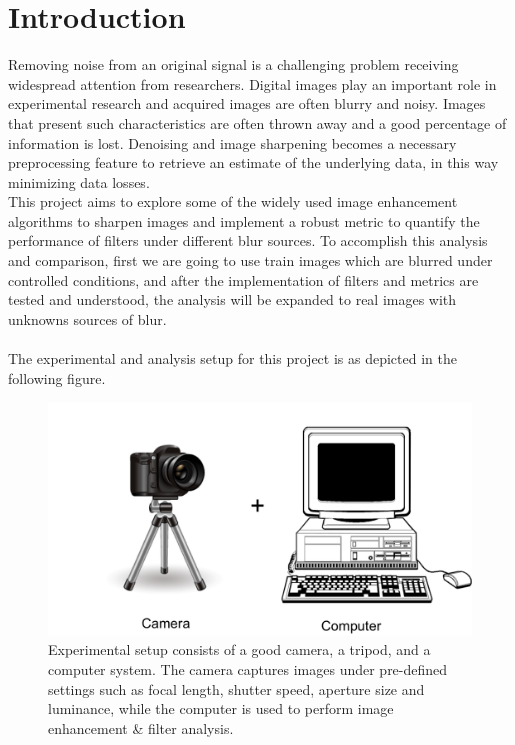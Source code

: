 \graphicspath{{mehul_pics/}}%

\section{Introduction}
Removing noise from an original signal is a challenging problem receiving widespread attention from researchers. Digital images play an important role in experimental research and acquired images are often blurry and noisy. Images that present such characteristics are often thrown away and a good percentage of information is lost. Denoising and image sharpening becomes a necessary  preprocessing feature to retrieve an estimate of the underlying data, in this way minimizing data losses.\\ 

This project aims to explore some of the widely used image enhancement algorithms to sharpen images and implement a robust metric to quantify the performance of filters under different blur sources. To accomplish this analysis and comparison, first we are going to use train images which are blurred under controlled conditions, and after the implementation of filters and metrics are tested and understood, the analysis will be expanded to real images with unknowns sources of blur.\\


\\
The experimental and analysis setup for this project is as depicted in the following figure.
\begin{figure}[h!]
  \centering
                \centering
                \includegraphics[width=.7\textwidth]{experimental_setup.png}
                \caption{Experimental setup consists of a good camera, a tripod, and a computer system. The camera captures images under pre-defined settings such as focal length, shutter speed, aperture size and luminance, while the computer is used to perform image enhancement \& filter analysis.}
\end{figure}

